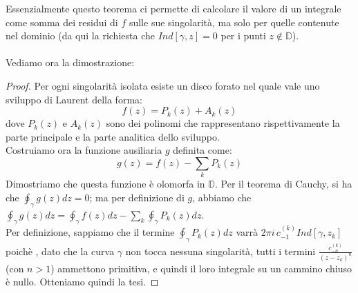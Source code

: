Essenzialmente questo teorema ci permette di calcolare il valore di un integrale come somma dei residui di $f$ sulle sue singolarità, ma solo per quelle contenute nel dominio (da qui la richiesta che $Ind[\gamma,z]=0$ per i punti $z \notin \mathbb{D}$).
\\
\\
Vediamo ora la dimostrazione:
\begin{proof}
Per ogni singolarità isolata esiste un disco forato nel quale vale uno sviluppo di Laurent della forma:
$$f(z)=P_k(z)+A_k(z)$$
dove $P_k(z)$ e $A_k(z)$ sono dei polinomi che rappresentano rispettivamente la parte principale e la parte analitica dello sviluppo.\\
Costruiamo ora la funzione ausiliaria $g$ definita come:
$$g(z)=f(z)- \sum_k P_k(z)$$
Dimostriamo che questa funzione è olomorfa in $\mathbb{D}$. Per il teorema di Cauchy, si ha che $\oint_{\gamma} g(z)dz=0$; ma per definizione di $g$, abbiamo che $\oint_{\gamma} g(z)dz=\oint_{\gamma} f(z)dz - \sum_k \oint_{\gamma} P_k(z) dz$. \\
Per definizione, sappiamo che il termine $\oint_{\gamma} P_k(z) dz$ varrà $2 \pi i \, c_{-1} ^{(k)} Ind[\gamma,z_k]$ poichè , dato che la curva $\gamma$ non tocca nessuna singolarità, tutti i termini $\frac{c_{-n} ^{(k)}}{(z-z_k)^n}$ (con $n>1$) ammettono primitiva, e quindi il loro integrale su un cammino chiuso è nullo. Otteniamo quindi la tesi.

\end{proof}

